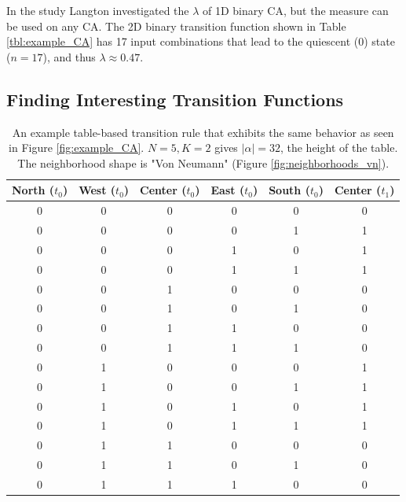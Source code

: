 In the study Langton investigated the $\lambda$ of 1D binary CA, but the measure can be used on any CA.
The 2D binary transition function shown in Table \ref{tbl:example_CA} has 17 input combinations that lead to the quiescent ($0$) state ($n = 17$), and thus $\lambda \approx 0.47$.

\subsection{Finding Interesting Transition Functions}
\label{sec:finding_transitions}
\begin{table}
    \centering
    \caption[Example table-based transition rule]{
        An example table-based transition rule that exhibits the same behavior as seen in Figure \ref{fig:example_CA}.
        $N=5, K=2$ gives $|\alpha|=32$, the height of the table.
        The neighborhood shape is "Von Neumann" (Figure \ref{fig:neighborhoods_vn}).}
    \begin{tabular}{ccccc|c}
    North ($t_0$) & West ($t_0$) & Center ($t_0$) & East ($t_0$) & South ($t_0$) & Center ($t_1$) \\ \hline
    0      & 0      & 0      & 0      & 0      & 0        \\
    0      & 0      & 0      & 0      & 1      & 1        \\
    0      & 0      & 0      & 1      & 0      & 1        \\
    0      & 0      & 0      & 1      & 1      & 1        \\
    0      & 0      & 1      & 0      & 0      & 0        \\
    0      & 0      & 1      & 0      & 1      & 0        \\
    0      & 0      & 1      & 1      & 0      & 0        \\
    0      & 0      & 1      & 1      & 1      & 0        \\
    0      & 1      & 0      & 0      & 0      & 1        \\
    0      & 1      & 0      & 0      & 1      & 1        \\
    0      & 1      & 0      & 1      & 0      & 1        \\
    0      & 1      & 0      & 1      & 1      & 1        \\
    0      & 1      & 1      & 0      & 0      & 0        \\
    0      & 1      & 1      & 0      & 1      & 0        \\
    0      & 1      & 1      & 1      & 0      & 0        \\

\end{tabular}
\end{table}
